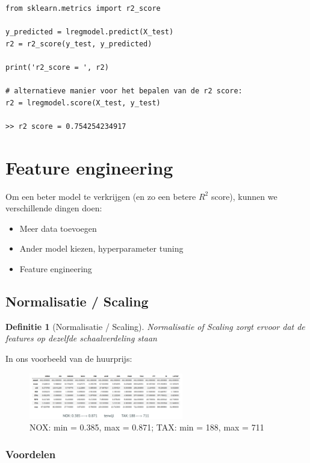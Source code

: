 \documentclass{article}
\newtheorem{theorem}{Definitie}[section]
\begin{document}
\begin{verbatim}
from sklearn.metrics import r2_score

y_predicted = lregmodel.predict(X_test)
r2 = r2_score(y_test, y_predicted)

print('r2_score = ', r2)

# alternatieve manier voor het bepalen van de r2 score:
r2 = lregmodel.score(X_test, y_test)

>> r2 score = 0.754254234917
\end{verbatim}

\section{Feature engineering}

Om een beter model te verkrijgen (en zo een betere $R^2$ score), kunnen we verschillende dingen doen:

\begin{itemize}
    \item Meer data toevoegen
    \item Ander model kiezen, hyperparameter tuning
    \item Feature engineering 
\end{itemize}

\subsection{Normalisatie / Scaling}

\begin{theorem}[Normalisatie / Scaling]
Normalisatie of Scaling zorgt ervoor dat de features op dezelfde schaalverdeling staan
\end{theorem}

In ons voorbeeld van de huurprijs:

\begin{figure}[H]
    \centering
    \includegraphics[width=0.6\textwidth]{normalisatie.png}
    \caption{NOX: min = 0.385, max = 0.871; TAX: min = 188, max = 711}
\end{figure}

\subsubsection{Voordelen}
\end{document}
